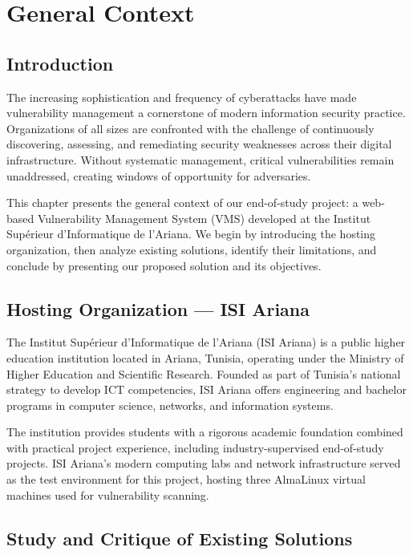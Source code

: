 \chapter{General Context}
\label{chap:context}

\section{Introduction}

The increasing sophistication and frequency of cyberattacks have made vulnerability management a cornerstone of modern information security practice. Organizations of all sizes are confronted with the challenge of continuously discovering, assessing, and remediating security weaknesses across their digital infrastructure. Without systematic management, critical vulnerabilities remain unaddressed, creating windows of opportunity for adversaries.

This chapter presents the general context of our end-of-study project: a web-based Vulnerability Management System (VMS) developed at the Institut Supérieur d'Informatique de l'Ariana. We begin by introducing the hosting organization, then analyze existing solutions, identify their limitations, and conclude by presenting our proposed solution and its objectives.

\section{Hosting Organization — ISI Ariana}

The Institut Supérieur d'Informatique de l'Ariana (ISI Ariana) is a public higher education institution located in Ariana, Tunisia, operating under the Ministry of Higher Education and Scientific Research. Founded as part of Tunisia's national strategy to develop ICT competencies, ISI Ariana offers engineering and bachelor programs in computer science, networks, and information systems.

The institution provides students with a rigorous academic foundation combined with practical project experience, including industry-supervised end-of-study projects. ISI Ariana's modern computing labs and network infrastructure served as the test environment for this project, hosting three AlmaLinux virtual machines used for vulnerability scanning.

\section{Study and Critique of Existing Solutions}

